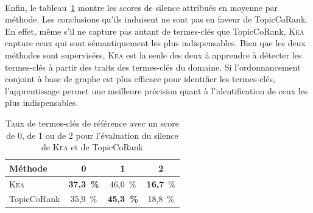       
        ~\\Enfin, le
        tableau~\ref{tab:main-domain_specific_keyphrase_annotation-manual_evaluation-analysis-topiccorank-silence_score_ratio}
        montre les scores de silence attribués en moyenne par méthode. Les
        conclusions qu'ils induisent ne sont pas en faveur de
        TopicCoRank. En effet, même s'il ne capture pas autant de termes-clés
        que TopicCoRank, \textsc{Kea} capture ceux qui sont sémantiquement les
        plus indispensables. Bien que les deux méthodes sont supervisées,
        \textsc{Kea} est la seule des deux à apprendre à détecter les
        termes-clés à partir des traits des termes-clés du domaine. Si
        l'ordonnancement conjoint à base de graphe est plus efficace pour
        identifier les termes-clés, l'apprentissage permet une meilleure
        précision quant à l'identification de ceux les plus indispensables.
        \begin{table}[h!]
          \centering
          \begin{tabular}{l|c|c|c}
            \toprule
            \textbf{Méthode} & \textbf{0} & \textbf{1} & \textbf{2}\\
            \hline
            \textsc{Kea} & \textbf{37,3~\%} & 46,0~\% & \textbf{16,7}~\%\\
            TopicCoRank & 35,9~\% & \textbf{45,3~\%} & 18,8~\%\\
            \bottomrule
          \end{tabular}
          \caption{Taux de termes-clés de référence avec un score de 0, de 1 ou
                   de 2 pour l'évaluation du silence de \textsc{Kea} et de
                   TopicCoRank
                   \label{tab:main-domain_specific_keyphrase_annotation-manual_evaluation-analysis-topiccorank-silence_score_ratio}}
        \end{table}

